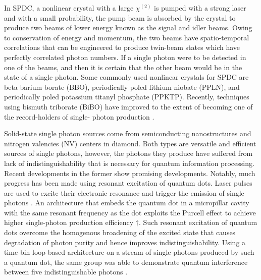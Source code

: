 \documentclass[aps,rmp,twocolumn,amsmath,amssymb,nofootinbib,superscriptaddress]{revtex4}
\newcommand{\sihui}[1]{{\color{Orchid}{#1}}}
\begin{document}
In SPDC, a nonlinear crystal with a large $\chi^{(2)}$ is pumped with a strong 
laser and with a small probability, the pump beam is absorbed by the crystal to 
produce two beams of lower energy known as the signal and idler beams. Owing to 
conservation of energy and momentum, the two beams have spatio-temporal 
correlations that can be engineered to produce twin-beam states which have 
perfectly correlated photon numbers. If a single photon were to be detected in one 
of the beams, and then it is certain that the other beam would be in the state of a 
single photon. Some commonly used nonlinear crystals for SPDC are beta barium 
borate (BBO), periodically poled lithium niobate (PPLN), and periodically poled 
potassium titanyl phosphate (PPKTP). Recently, techniques using bismuth triborate 
(BiBO) have improved to the extent of becoming one of the record-holders of single-
photon production \cite{bib:WangChen16}.

\sihui{ Discuss architectures for producing entangled photon states like GHZ, maybe here or in a different subsection.}

Solid-state single photon sources come from semiconducting nanostructures and 
nitrogen valencies (NV) centers in diamond. Both types are versatile and efficient 
sources of single photons, however, the photons they produce have suffered from 
lack of indistinguishability that is necessary for quantum information processing.
Recent developments in the former show promising developments. Notably, much 
progress has been made using resonant excitation of quantum dots. Laser pulses are 
used to excite their electronic resonance and trigger the emission of single 
photons \cite{bib:Muller07,bib:Vamivakas09, bib:Flagg09,bib:Ates09, bib:Dirk10,
bib:1748,bib:Jayakumar13,bib:Wei14,bib:Muller14,bib:Unsleber15,
bib:237403,bib:Sweeney14}. An architecture that embeds the quantum dot in a 
micropillar cavity with the same resonant frequency as the dot exploits the 
Purcell effect to achieve higher single-photon production efficiency 
†\cite{bib:Ding16,bib:213601}. 
Such resonant excitation of quantum dots overcome the homogenous broadening of the 
excited state that causes degradation of photon purity and hence improves
indistinguishability. Using a time-bin loop-based architecture \cite{bib:Motes14} 
on a stream of single photons produced by such a quantum dot, the same group was 
able to demonstrate quantum interference between five indistinguishable photons 
\cite{bib:WangChen16}.
\end{document}
